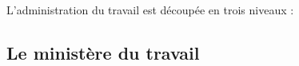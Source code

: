 L'administration du travail est découpée en trois niveaux :

\subsection{Le ministère du travail}
	
